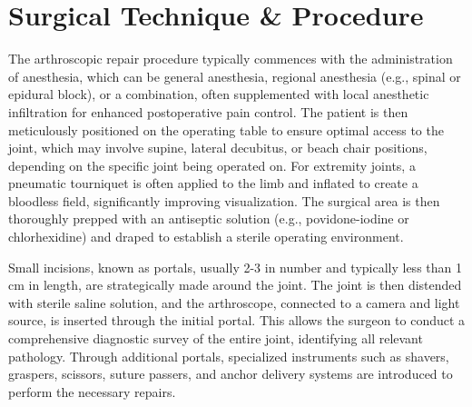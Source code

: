 \section*{Surgical Technique \& Procedure}
The arthroscopic repair procedure typically commences with the administration of anesthesia, which can be general anesthesia, regional anesthesia (e.g., spinal or epidural block), or a combination, often supplemented with local anesthetic infiltration for enhanced postoperative pain control. The patient is then meticulously positioned on the operating table to ensure optimal access to the joint, which may involve supine, lateral decubitus, or beach chair positions, depending on the specific joint being operated on. For extremity joints, a pneumatic tourniquet is often applied to the limb and inflated to create a bloodless field, significantly improving visualization. The surgical area is then thoroughly prepped with an antiseptic solution (e.g., povidone-iodine or chlorhexidine) and draped to establish a sterile operating environment.

Small incisions, known as portals, usually 2-3 in number and typically less than 1 cm in length, are strategically made around the joint. The joint is then distended with sterile saline solution, and the arthroscope, connected to a camera and light source, is inserted through the initial portal. This allows the surgeon to conduct a comprehensive diagnostic survey of the entire joint, identifying all relevant pathology. Through additional portals, specialized instruments such as shavers, graspers, scissors, suture passers, and anchor delivery systems are introduced to perform the necessary repairs.


